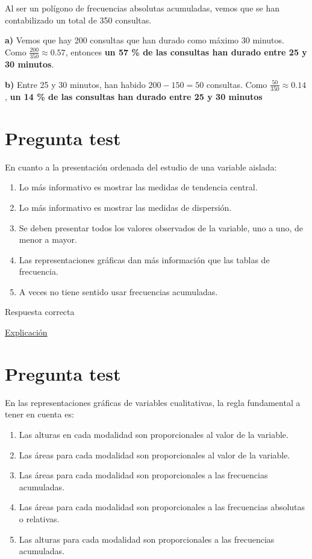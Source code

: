 \documentclass[
]{book}
\providecommand{\tightlist}{%
  \setlength{\itemsep}{0pt}\setlength{\parskip}{0pt}}
\begin{document}
Al ser un polígono de frecuencias absolutas acumuladas, vemos que se han contabilizado un total de 350 consultas.

\textbf{a)} Vemos que hay 200 consultas que han durado como máximo 30 minutos. Como \(\frac{200}{350} \approx 0.57\), entonces \textbf{un 57 \% de las consultas han durado entre 25 y 30 minutos}.

\textbf{b)} Entre 25 y 30 minutos, han habido \(200 - 150 = 50\) consultas. Como \(\frac{50}{350} \approx 0.14\), \textbf{un 14 \% de las consultas han durado entre 25 y 30 minutos}

\hypertarget{pregunta-test-51}{%
\section{Pregunta test}\label{pregunta-test-51}}

En cuanto a la presentación ordenada del estudio de una variable aislada:

\begin{enumerate}
\def\labelenumi{\alph{enumi})}
\tightlist
\item
  Lo más informativo es mostrar las medidas de tendencia central.
\item
  Lo más informativo es mostrar las medidas de dispersión.
\item
  Se deben presentar todos los valores observados de la variable, uno a uno, de menor a mayor.
\item
  Las representaciones gráficas dan más información que las tablas de frecuencia.
\item
  A veces no tiene sentido usar frecuencias acumuladas.
\end{enumerate}

Respuesta correcta

\href{https://1fjmanzano.github.io/bioestadistica/otros-gra\%CC\%81ficos.html}{Explicación}

\hypertarget{pregunta-test-52}{%
\section{Pregunta test}\label{pregunta-test-52}}

En las representaciones gráficas de variables cualitativas, la regla fundamental a tener en cuenta es:

\begin{enumerate}
\def\labelenumi{\alph{enumi})}
\tightlist
\item
  Las alturas en cada modalidad son proporcionales al valor de la variable.
\item
  Las áreas para cada modalidad son proporcionales al valor de la variable.
\item
  Las áreas para cada modalidad son proporcionales a las frecuencias acumuladas.
\item
  Las áreas para cada modalidad son proporcionales a las frecuencias absolutas o relativas.
\item
  Las alturas para cada modalidad son proporcionales a las frecuencias acumuladas.
\end{enumerate}
\end{document}
